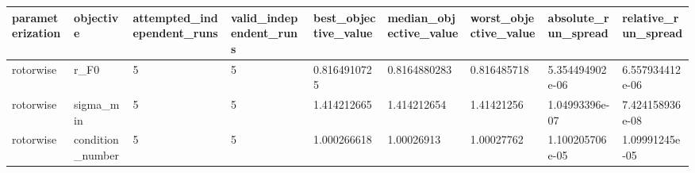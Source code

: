 \begin{tabular}{@{}lllllllll@{}}
\toprule
parameterization & objective & attempted\_independent\_runs & valid\_independent\_runs & best\_objective\_value & median\_objective\_value & worst\_objective\_value & absolute\_run\_spread & relative\_run\_spread \\
\midrule
rotorwise & r\_F0 & 5 & 5 & 0.8164910725 & 0.8164880283 & 0.816485718 & 5.354494902e-06 & 6.557934412e-06 \\
rotorwise & sigma\_min & 5 & 5 & 1.414212665 & 1.414212654 & 1.41421256 & 1.04993396e-07 & 7.424158936e-08 \\
rotorwise & condition\_number & 5 & 5 & 1.000266618 & 1.00026913 & 1.00027762 & 1.100205706e-05 & 1.09991245e-05 \\
\bottomrule
\end{tabular}
